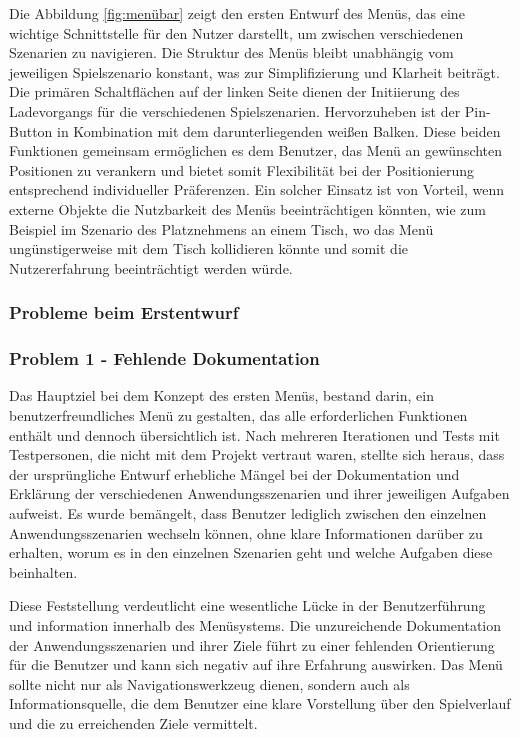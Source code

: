 Die Abbildung \ref{fig:menübar} zeigt den ersten Entwurf des Menüs, das eine wichtige Schnittstelle für den Nutzer darstellt, um zwischen verschiedenen Szenarien zu navigieren. Die Struktur des Menüs bleibt unabhängig vom jeweiligen Spielszenario konstant, was zur Simplifizierung und Klarheit beiträgt. Die primären Schaltflächen auf der linken Seite dienen der Initiierung des Ladevorgangs für die verschiedenen Spielszenarien. Hervorzuheben ist der Pin-Button in Kombination mit dem darunterliegenden weißen Balken. Diese beiden Funktionen gemeinsam ermöglichen es dem Benutzer, das Menü an gewünschten Positionen zu verankern und bietet somit Flexibilität bei der Positionierung entsprechend individueller Präferenzen. Ein solcher Einsatz ist von Vorteil, wenn externe Objekte die Nutzbarkeit des Menüs beeinträchtigen könnten, wie zum Beispiel im Szenario des Platznehmens an einem Tisch, wo das Menü ungünstigerweise mit dem Tisch kollidieren könnte und somit die Nutzererfahrung beeinträchtigt werden würde.

\subsubsection{Probleme beim Erstentwurf}
\subsubsection*{Problem 1 - Fehlende Dokumentation}
Das Hauptziel bei dem Konzept des ersten Menüs, bestand darin, ein benutzerfreundliches Menü zu gestalten, das alle erforderlichen Funktionen enthält und dennoch übersichtlich ist. Nach mehreren Iterationen und Tests mit Testpersonen, die nicht mit dem Projekt vertraut waren, stellte sich heraus, dass der ursprüngliche Entwurf erhebliche Mängel bei der Dokumentation und Erklärung der verschiedenen Anwendungsszenarien und ihrer jeweiligen Aufgaben aufweist. Es wurde bemängelt, dass Benutzer lediglich zwischen den einzelnen Anwendungsszenarien wechseln können, ohne klare Informationen darüber zu erhalten, worum es in den einzelnen Szenarien geht und welche Aufgaben diese beinhalten.

Diese Feststellung verdeutlicht eine wesentliche Lücke in der Benutzerführung und information innerhalb des Menüsystems. Die unzureichende Dokumentation der Anwendungsszenarien und ihrer Ziele führt zu einer fehlenden Orientierung für die Benutzer und kann sich negativ auf ihre Erfahrung auswirken. Das Menü sollte nicht nur als Navigationswerkzeug dienen, sondern auch als Informationsquelle, die dem Benutzer eine klare Vorstellung über den Spielverlauf und die zu erreichenden Ziele vermittelt.

